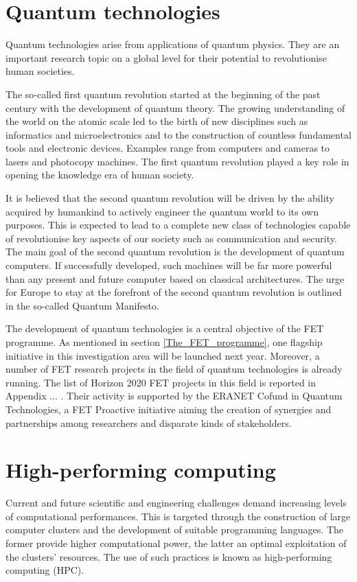 \section{Quantum technologies} \label{Quantum_technologies}
Quantum technologies arise from applications of quantum physics. They are an important research topic on a global level for their potential to revolutionise human societies.

The so-called first quantum revolution started at the beginning of the past century with the development of quantum theory. The growing understanding of the world on the atomic scale led to the birth of new disciplines such as informatics and microelectronics and to the construction of countless fundamental tools and electronic devices. Examples range from computers and cameras to lasers and photocopy machines. The first quantum revolution played a key role in opening the knowledge era of human society.

It is believed that the second quantum revolution will be driven by the ability acquired by humankind to actively engineer the quantum world to its own purposes. This is expected to lead to a complete new class of technologies capable of revolutionise key aspects of our society such as communication and security. The main goal of the second quantum revolution is the development of quantum computers. If successfully developed, such machines will be far more powerful than any present and future computer based on classical architectures. The urge for Europe to stay at the forefront of the second quantum revolution is outlined in the so-called Quantum Manifesto.


The development of quantum technologies is a central objective of the FET programme. As mentioned in section \ref{The_FET_programme}, one flagship initiative in this investigation area will be launched next year. Moreover, a number of FET research projects in the field of quantum technologies is already running. The list of Horizon 2020 FET projects in this field is reported in Appendix ... . Their activity is supported by the ERANET Cofund in Quantum Technologies, a FET Proactive initiative aiming the creation of synergies and partnerships among researchers and disparate kinds of stakeholders. 

\section{High-performing computing} \label{High-performing_computing}
Current and future scientific and engineering challenges demand increasing levels of computational performances. This is targeted through the construction of large computer clusters and the development of suitable programming languages. The former provide higher computational power, the latter an optimal exploitation of the clusters' resources. The use of such practices is known as high-performing computing (HPC).

